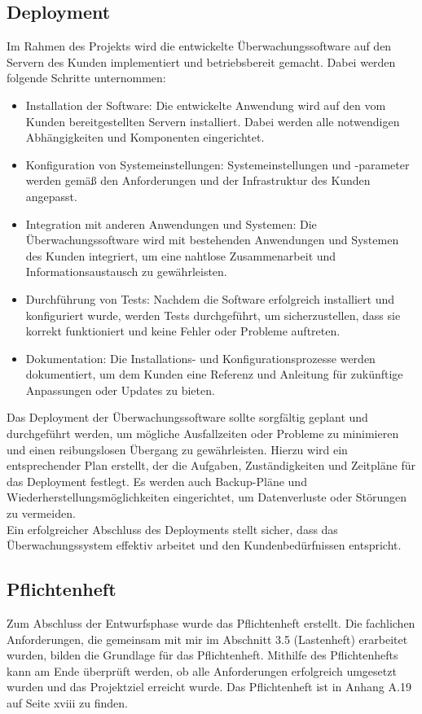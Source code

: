 \begin{flushleft}
	\subsection{Deployment} Im Rahmen des Projekts wird die entwickelte Überwachungssoftware auf den Servern des Kunden implementiert und betriebsbereit gemacht. Dabei werden folgende Schritte unternommen:

	\begin{itemize}
		\item Installation der Software: Die entwickelte Anwendung wird auf den vom Kunden bereitgestellten Servern installiert. Dabei werden alle notwendigen Abhängigkeiten und Komponenten eingerichtet.
		\item Konfiguration von Systemeinstellungen: Systemeinstellungen und -parameter werden gemäß den Anforderungen und der Infrastruktur des Kunden angepasst.
		\item Integration mit anderen Anwendungen und Systemen: Die Überwachungssoftware wird mit bestehenden Anwendungen und Systemen des Kunden integriert, um eine nahtlose Zusammenarbeit und Informationsaustausch zu gewährleisten.
		\item Durchführung von Tests: Nachdem die Software erfolgreich installiert und konfiguriert wurde, werden Tests durchgeführt, um sicherzustellen, dass sie korrekt funktioniert und keine Fehler oder Probleme auftreten.
		\item Dokumentation: Die Installations- und Konfigurationsprozesse werden dokumentiert, um dem Kunden eine Referenz und Anleitung für zukünftige Anpassungen oder Updates zu bieten.
	\end{itemize}

	Das Deployment der Überwachungssoftware sollte sorgfältig geplant und durchgeführt werden, um mögliche Ausfallzeiten oder Probleme zu minimieren und einen reibungslosen Übergang zu gewährleisten. Hierzu wird ein entsprechender Plan erstellt, der die Aufgaben, Zuständigkeiten und Zeitpläne für das Deployment festlegt. Es werden auch Backup-Pläne und Wiederherstellungsmöglichkeiten eingerichtet, um Datenverluste oder Störungen zu vermeiden.
	\\
	Ein erfolgreicher Abschluss des Deployments stellt sicher, dass das Überwachungssystem effektiv arbeitet und den Kundenbedürfnissen entspricht.
	\subsection{Pflichtenheft}
	Zum Abschluss der Entwurfsphase wurde das Pflichtenheft erstellt. Die fachlichen Anforderungen, die gemeinsam mit mir im Abschnitt 3.5 (Lastenheft) erarbeitet wurden, bilden die Grundlage für das Pflichtenheft. Mithilfe des Pflichtenhefts kann am Ende überprüft werden, ob alle Anforderungen erfolgreich umgesetzt wurden und das Projektziel erreicht wurde. Das Pflichtenheft ist in Anhang A.19 auf Seite xviii zu finden.


\end{flushleft}
